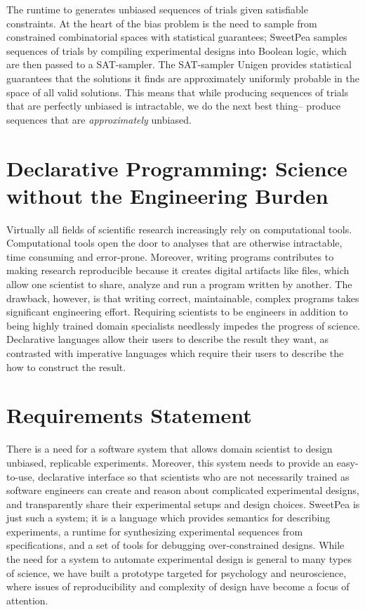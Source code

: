 The runtime to generates unbiased sequences of trials given satisfiable constraints. At the heart of the bias problem is the need to sample from constrained combinatorial spaces with statistical guarantees; SweetPea samples sequences of trials by compiling experimental designs into Boolean logic, which are then passed to a SAT-sampler. The SAT-sampler Unigen %
provides statistical guarantees that the solutions it finds are approximately uniformly probable in the space of all valid solutions. This means that while producing sequences of trials that are perfectly unbiased is intractable, we do the next best thing-- produce sequences that are \emph{approximately} unbiased.

\section{Declarative Programming: Science without the Engineering Burden}

Virtually all fields of scientific research increasingly rely on computational tools. Computational tools open the door to analyses that are otherwise intractable, time consuming and error-prone. Moreover, writing programs contributes to making research reproducible because it creates digital artifacts like files, which allow one scientist to share, analyze and run a program written by another. The drawback, however, is that writing correct, maintainable, complex programs takes significant engineering effort. Requiring scientists to be engineers in addition to being highly trained domain specialists needlessly impedes the progress of science. Declarative languages allow their users to describe the result they want, as contrasted with imperative languages which require their users to describe the how to construct the result.



\section{Requirements Statement}

There is a need for a software system that allows domain scientist to design unbiased, replicable experiments. Moreover, this system needs to provide an easy-to-use, declarative interface so that scientists who are not necessarily trained as software engineers can create and reason about complicated experimental designs, and transparently share their experimental setups and design choices. SweetPea is just such a system; it is a language which provides semantics for describing experiments, a runtime for synthesizing experimental sequences from specifications, and a set of tools for debugging over-constrained designs. While the need for a system to automate experimental design is general to many types of science, we have built a prototype targeted for psychology and neuroscience, where issues of reproducibility and complexity of design have become a focus of attention.



